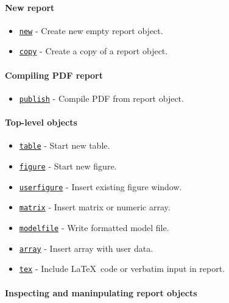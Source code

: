 

	\paragraph{New report}

\begin{itemize}
\itemsep1pt\parskip0pt
\item
  \href{report/new}{\texttt{new}} - Create new empty report object.
\item
  \href{report/copy}{\texttt{copy}} - Create a copy of a report object.
\end{itemize}

\paragraph{Compiling PDF report}

\begin{itemize}
\itemsep1pt\parskip0pt
\item
  \href{report/publish}{\texttt{publish}} - Compile PDF from report
  object.
\end{itemize}

\paragraph{Top-level objects}

\begin{itemize}
\itemsep1pt\parskip0pt
\item
  \href{report/table}{\texttt{table}} - Start new table.
\item
  \href{report/figure}{\texttt{figure}} - Start new figure.
\item
  \href{report/userfigure}{\texttt{userfigure}} - Insert existing figure
  window.
\item
  \href{report/matrix}{\texttt{matrix}} - Insert matrix or numeric
  array.
\item
  \href{report/modelfile}{\texttt{modelfile}} - Write formatted model
  file.
\item
  \href{report/array}{\texttt{array}} - Insert array with user data.
\item
  \href{report/tex}{\texttt{tex}} - Include \LaTeX~code or verbatim
  input in report.
\end{itemize}

\paragraph{Inspecting and maninpulating report
objects}

